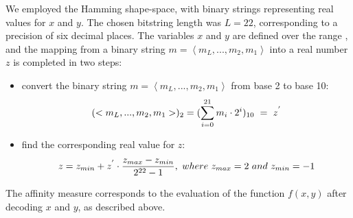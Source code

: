 \documentclass{article}
\begin{document}
We employed the Hamming shape-space, with binary strings representing real values for \begin{math} x \end{math} and \begin{math} y \end{math}. The chosen bitstring length was \begin{math} L = 22 \end{math},  corresponding to a precision of six decimal places. The variables \begin{math} x \end{math} and \begin{math} y \end{math} are defined over the range \begin{math} [-1, 2]\end{math},  and the mapping from a binary string  \begin{math} m =\left \langle m_L,..., m_2, m_1\right\rangle\end{math} into a real number \begin{math} z \end{math} is completed in two steps:
\begin{itemize}
    \item {convert the binary string \begin{math} m =\left \langle m_L,..., m_2, m_1\right\rangle\end{math} from base 2 to base 10:}
    \begin{equation}\small{(<m_L,..., m_2, m_1>)_2 = (\sum_{i=0}^{21}m_i \cdot 2^i)_{10} \ = \ z^{'}}
    \end{equation}
    \item{find the corresponding real value for \begin{math} z \end{math}:}
    \begin{equation}\small{z=z_{min} + z^{'} \cdot \frac{z_{max} - z_{min}}{2^{22} - 1}, \ where \ z_{max} = 2 \ and \ z_{min} = -1
    }
    \end{equation}
\end{itemize}

The affinity measure corresponds to the evaluation of the
function \begin{math} f(x, y) \end{math} after decoding \begin{math} x \end{math} and \begin{math} y \end{math}, as described above.
\end{document}

